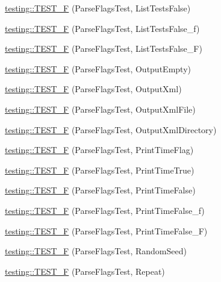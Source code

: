 \begin{DoxyCompactItemize}
\item 
\mbox{\hyperlink{namespacetesting_a983e3df92745027bf68413ecc09f4198}{testing\+::\+T\+E\+S\+T\+\_\+F}} (Parse\+Flags\+Test, List\+Tests\+False)
\item 
\mbox{\hyperlink{namespacetesting_a381c90024f28d66ed25e687a94c8b329}{testing\+::\+T\+E\+S\+T\+\_\+F}} (Parse\+Flags\+Test, List\+Tests\+False\+\_\+f)
\item 
\mbox{\hyperlink{namespacetesting_a05a7a818dedb4fdf5b0aac632d97e2dc}{testing\+::\+T\+E\+S\+T\+\_\+F}} (Parse\+Flags\+Test, List\+Tests\+False\+\_\+F)
\item 
\mbox{\hyperlink{namespacetesting_a27d34eacec5189fae8349b4a96aea619}{testing\+::\+T\+E\+S\+T\+\_\+F}} (Parse\+Flags\+Test, Output\+Empty)
\item 
\mbox{\hyperlink{namespacetesting_addbcb86017a124d8e6afbc6933b7c251}{testing\+::\+T\+E\+S\+T\+\_\+F}} (Parse\+Flags\+Test, Output\+Xml)
\item 
\mbox{\hyperlink{namespacetesting_aba922f243ca36645e7001596dc61ad9b}{testing\+::\+T\+E\+S\+T\+\_\+F}} (Parse\+Flags\+Test, Output\+Xml\+File)
\item 
\mbox{\hyperlink{namespacetesting_aa3fd714488b3f3caa6af5394a63d38f4}{testing\+::\+T\+E\+S\+T\+\_\+F}} (Parse\+Flags\+Test, Output\+Xml\+Directory)
\item 
\mbox{\hyperlink{namespacetesting_a9442229ba2091a4f892a36519f458be8}{testing\+::\+T\+E\+S\+T\+\_\+F}} (Parse\+Flags\+Test, Print\+Time\+Flag)
\item 
\mbox{\hyperlink{namespacetesting_ae26478ca77d32fa5a519294b23a423f2}{testing\+::\+T\+E\+S\+T\+\_\+F}} (Parse\+Flags\+Test, Print\+Time\+True)
\item 
\mbox{\hyperlink{namespacetesting_aae74ae96560ea57a139eb6c8f502aa35}{testing\+::\+T\+E\+S\+T\+\_\+F}} (Parse\+Flags\+Test, Print\+Time\+False)
\item 
\mbox{\hyperlink{namespacetesting_a4d0ef8499ed9a23e0e4b6d8ae66a61c8}{testing\+::\+T\+E\+S\+T\+\_\+F}} (Parse\+Flags\+Test, Print\+Time\+False\+\_\+f)
\item 
\mbox{\hyperlink{namespacetesting_a776cc6047fe6c96564bea11143aebc3e}{testing\+::\+T\+E\+S\+T\+\_\+F}} (Parse\+Flags\+Test, Print\+Time\+False\+\_\+F)
\item 
\mbox{\hyperlink{namespacetesting_a8c91f18e468506e7d64fa57fdec303c4}{testing\+::\+T\+E\+S\+T\+\_\+F}} (Parse\+Flags\+Test, Random\+Seed)
\item 
\mbox{\hyperlink{namespacetesting_aad196be6244a5fd202ea05c8c409b0d1}{testing\+::\+T\+E\+S\+T\+\_\+F}} (Parse\+Flags\+Test, Repeat)

\end{DoxyCompactItemize}
